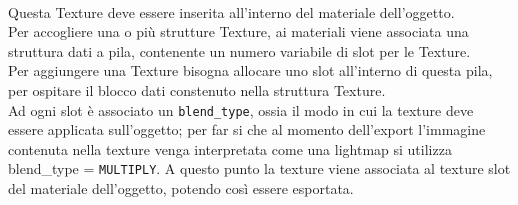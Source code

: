 \\
Questa Texture deve essere inserita all’interno del materiale dell’oggetto.
\\
Per accogliere una o più strutture Texture, ai materiali viene associata una struttura dati a pila, contenente un numero variabile di slot per le Texture.
\\ 
Per aggiungere una Texture bisogna allocare uno slot all’interno di questa pila, per ospitare il blocco dati constenuto nella struttura Texture. 
\\
Ad ogni slot è associato un \texttt{blend\_type}, ossia il modo in cui la texture deve essere applicata sull’oggetto; per far si che al momento dell’export l’immagine contenuta nella texture venga interpretata come una lightmap si utilizza blend\_type = \texttt{MULTIPLY}. 
A questo punto la texture viene associata al texture slot del materiale dell’oggetto, potendo così essere esportata.